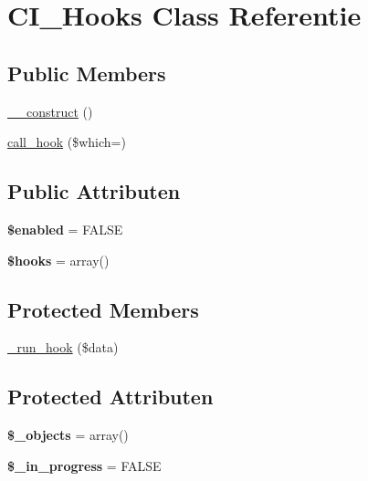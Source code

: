 \hypertarget{class_c_i___hooks}{}\section{C\+I\+\_\+\+Hooks Class Referentie}
\label{class_c_i___hooks}
\subsection*{Public Members}
\begin{DoxyCompactItemize}
\item 
\mbox{\hyperlink{class_c_i___hooks_a095c5d389db211932136b53f25f39685}{\+\_\+\+\_\+construct}} ()
\item 
\mbox{\hyperlink{class_c_i___hooks_a470d397aaf24f1ca3ef73021ad03492b}{call\+\_\+hook}} (\$which=\textquotesingle{}\textquotesingle{})
\end{DoxyCompactItemize}
\subsection*{Public Attributen}
\begin{DoxyCompactItemize}
\item 
\mbox{\label{class_c_i___hooks_a8d376199cc641e3e7af6e1a0d5c736d9}} 
{\bfseries \$enabled} = F\+A\+L\+SE
\item 
\mbox{\label{class_c_i___hooks_a05aec88c3516c6db5da524fbcc673aff}} 
{\bfseries \$hooks} = array()
\end{DoxyCompactItemize}
\subsection*{Protected Members}
\begin{DoxyCompactItemize}
\item 
\mbox{\hyperlink{class_c_i___hooks_a2cd07b3fcfaf153a37f164d3fbc7c3d9}{\+\_\+run\+\_\+hook}} (\$data)
\end{DoxyCompactItemize}
\subsection*{Protected Attributen}
\begin{DoxyCompactItemize}
\item 
\mbox{\label{class_c_i___hooks_a7f925b11c74f8a8aa0d4627c6f7844ce}} 
{\bfseries \$\+\_\+objects} = array()
\item 
\mbox{\label{class_c_i___hooks_a6e8d0edcf7a4fb3e76c0f6d00e70053e}} 
{\bfseries \$\+\_\+in\+\_\+progress} = F\+A\+L\+SE
\end{DoxyCompactItemize}


